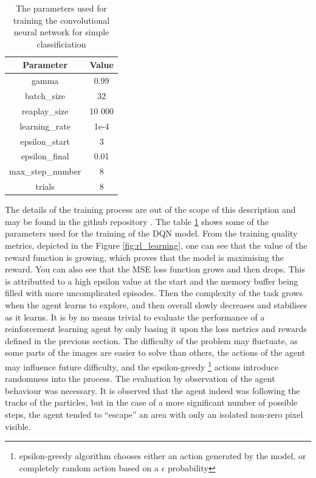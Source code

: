 \begin{table}[h]
\begin{center}
\begin{tabular}{ |c|c|}
\hline
Parameter & Value\\
\hline
gamma & 0.99 \\
batch\_size & 32 \\
reaplay\_size & 10 000 \\
learning\_rate & 1e-4\\
epsilon\_start & 3\\
epsilon\_final & 0.01 \\
max\_step\_number & 8 \\
trials & 8 \\

\hline
\end{tabular}
\caption{\label{tab:rl_params} The parameters used for training the convolutional neural network for simple classificiation}
\end{center}
\end{table}
The details of the training process are out of the scope of this description and may be found in the github repository \cite{dqn_lartpc}.
The table \ref{tab:rl_params} shows some of the parameters used for the training of the DQN model.
From the training quality metrics, depicted in the Figure \ref{fig:rl_learning}, one can see that the value of the reward function is growing, which proves that the model is maximising the reward. You can also see that the MSE loss function grows and then drops. This is attributted to a high epsilon value at the start and the memory buffer being filled with more uncomplicated episodes. Then the complexity of the task grows when the agent learns to explore, and then overall slowly decreases and stabilises as it learns.
It is by no means trivial to evaluate the performance of a reinforcement learning agent by only basing it upon the loss metrics and rewards defined in the previous section. The difficulty of the problem may fluctuate, as some parts of the images are easier to solve than others, the actions of the agent may influence future difficulty, and the epsilon-greedy \footnote{epsilon-greedy algorithm chooses either an action generated by the model, or completely random action based on a $\epsilon$ probability} actions introduce randomness into the process. The evaluation by observation of the agent behaviour was necessary.
It is observed that the agent indeed was following the tracks of the particles, but in the case of a more significant number of possible steps, the agent tended to ``escape'' an area with only an isolated non-zero pixel visible.

